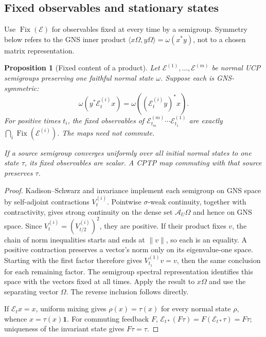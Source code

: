 \documentclass[12pt]{article}
\newtheorem{proposition}[theorem]{Proposition}
\theoremstyle{definition}
\theoremstyle{remark}
\begin{document}
\subsection{Fixed observables and stationary states}

Use \(\operatorname{Fix}(\mathcal E)\) for observables fixed at every
time by a semigroup. Symmetry below refers to the GNS inner product
\(\langle x\Omega,y\Omega\rangle=\omega(x^*y)\), not to a chosen
matrix representation.

\begin{proposition}[Fixed content of a product]\label{prop:fixedproduct}
Let \(\mathcal E^{(1)},\ldots,\mathcal E^{(m)}\) be normal UCP
semigroups preserving one faithful normal state \(\omega\).
Suppose each is GNS-symmetric:
\[
 \omega(y^*\mathcal E_t^{(i)}x)
 =\omega((\mathcal E_t^{(i)}y)^*x).
\]
For positive times \(t_i\), the fixed observables of
\(\mathcal E_{t_m}^{(m)}\cdots\mathcal E_{t_1}^{(1)}\) are exactly
\(\bigcap_i\operatorname{Fix}(\mathcal E^{(i)})\).
The maps need not commute.

If a source semigroup converges uniformly over all initial normal
states to one state \(\tau\), its fixed observables are scalar.
A CPTP map commuting with that source preserves \(\tau\).
\end{proposition}
\begin{proof}
Kadison--Schwarz and invariance implement each semigroup on GNS space
by self-adjoint contractions \(V_t^{(i)}\).
Pointwise \(\sigma\)-weak continuity, together with contractivity,
gives strong continuity on the dense set \(\mathcal A_U\Omega\)
and hence on GNS space.
Since \(V_t^{(i)}=(V_{t/2}^{(i)})^2\), they are positive.
If their product fixes \(v\), the chain of norm inequalities starts
and ends at \(\|v\|\), so each is an equality. A positive contraction
preserves a vector's norm only on its eigenvalue-one space. Starting
with the first factor therefore gives \(V_{t_1}^{(1)}v=v\), then
the same conclusion for each remaining factor. The semigroup spectral
representation identifies this space with the vectors fixed at all
times. Apply the result to \(x\Omega\) and use the separating vector
\(\Omega\). The reverse inclusion follows directly.

If \(\mathcal E_t x=x\), uniform mixing gives
\(\rho(x)=\tau(x)\) for every normal state \(\rho\), whence
\(x=\tau(x)\mathbf1\).
For commuting feedback \(F\),
\(\mathcal E_{t*}(F\tau)=F(\mathcal E_{t*}\tau)=F\tau\);
uniqueness of the invariant state gives \(F\tau=\tau\).
\end{proof}
\end{document}
